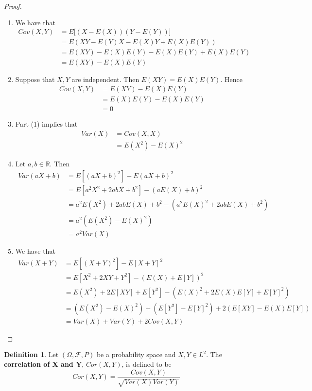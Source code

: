 \documentclass[12pt]{amsart}
\theoremstyle{definition}
\newtheorem{defn}[definition]{Definition}
\newcommand{\Om}{\Omega}
\newcommand{\R}{\mathbb{R}}
\newcommand{\MF}{\mathcal{F}}
\begin{document}
	\begin{proof}\
		\begin{enumerate}
			\item We have that
			\begin{align*}
				Cov(X,Y) 
				&= E\bigg[ (X-E(X))(Y-E(Y)) \bigg] \\
				&= E(XY -E(Y)X - E(X)Y + E(X)E(Y)) \\
				&= E(XY) - E(X)E(Y) - E(X)E(Y) + E(X)E(Y) \\ 
				&= E(XY) - E(X)E(Y)
			\end{align*}
			\item Suppose that $X,Y$ are independent. Then $E(XY) = E(X)E(Y)$. Hence 
			\begin{align*}
				Cov(X,Y) 
				&= E(XY) - E(X)E(Y) \\
				&= E(X)E(Y) - E(X)E(Y) \\
				&= 0
			\end{align*}
			\item Part (1) implies that 
			\begin{align*}
				Var(X) 
				&= Cov(X, X) \\
				&= E(X^2) -E(X)^2
			\end{align*}
			\item Let $a,b \in \R$. Then
			\begin{align*}
				Var(aX+b)
				&= E[(aX+b)^2] - E(aX+b)^2 \\
				&= E[a^2X^2 + 2abX +b^2] - (aE(X)+b)^2 \\
				&= a^2E(X^2)+2abE(X) + b^2 - (a^2E(X)^2 +2abE(X)+b^2) \\
				&= a^2(E(X^2)-E(X)^2) \\
				&= a^2Var(X)
			\end{align*} 
			\item We have that 
			\begin{align*}
				Var(X+Y) 
				&= E[(X+Y)^2] - E[X+Y]^2 \\
				&= E[X^2 +2XY + Y^2] -(E(X)+E[Y])^2 \\
				&= E(X^2) + 2E[XY] + E[Y^2] - (E(X)^2 + 2E(X)E[Y] + E[Y]^2) \\
				&= (E(X^2) - E(X)^2) + (E[Y^2]- E[Y]^2) + 2(E[XY] - E(X)E[Y]) \\
				&= Var(X) + Var(Y) + 2Cov(X,Y)
			\end{align*}
		\end{enumerate}
	\end{proof}
	
	\begin{defn}
		Let $(\Om, \MF, P)$ be a probability space and $X,Y \in L^2$. The \textbf{correlation of X and Y}, $Cor(X,Y)$, is defined to be $$Cor(X,Y) = \frac{Cov(X,Y)}{\sqrt{Var(X)Var(Y)}}$$
	\end{defn}
	
\end{document}
